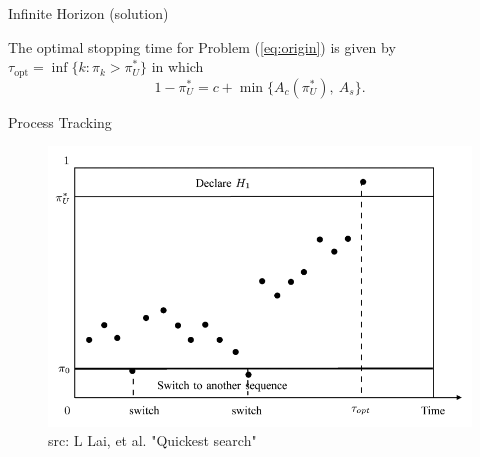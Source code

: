\documentclass[xcolor={svgnames}]{beamer}
\begin{document}
\begin{frame}{Infinite Horizon (solution)}
  \begin{theorem}
    The optimal stopping time for Problem (\ref{eq:origin}) is given by \alert{$\tau_{\text{opt}} = \inf\{k: \pi_k > \pi_U^*\}$} in which
    \[
      1 - \pi_U^* = c + \min\{A_{c}(\pi_U^*), ~A_{s}\}.
    \]
  \end{theorem}

\end{frame}
\begin{frame}{Process Tracking}
  \begin{figure}
      \centering
      \includegraphics[width=.85\textwidth]{fig3}\\[-8pt]
      {\tiny src: L Lai, et al. "Quickest search"}
  \end{figure}
\end{frame}
\end{document}
